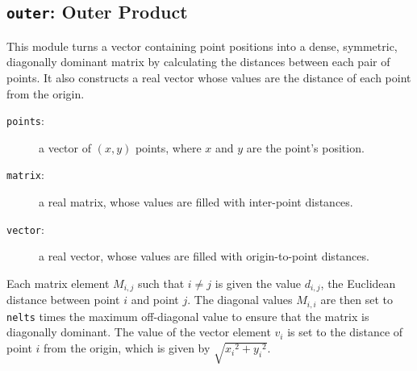 \subsection{{\tt{outer}}: Outer Product\label{s:toys-outer}}

This module turns a vector containing point positions
into a dense, symmetric, diagonally dominant matrix
by calculating the distances between each pair of points.
It also constructs a real vector whose values are
the distance of each point from the origin.

{}

\begin{description}
\item[{\tt{points}}:]
	a vector of $(x,y)$ points, where $x$ and $y$ are the point's position.
\end{description}

{\outputspec}

\begin{description}
\item[{\tt{matrix}}:]
	a real matrix, whose values are filled with inter-point distances.
\item[{\tt{vector}}:]
	a real vector, whose values are filled with origin-to-point distances.
\end{description}

Each matrix element $M_{i,j}$ such that $i \neq j$
is given the value $d_{i, j}$,
the Euclidean distance between point $i$ and point $j$.
The diagonal values $M_{i, i}$ are then set to
{\tt{nelts}} times the maximum off-diagonal value
to ensure that the matrix is diagonally dominant.
The value of the vector element $v_i$ is set to
the distance of point $i$ from the origin,
which is given by $\sqrt{{x_i}^2 + {y_i}^2}$.
